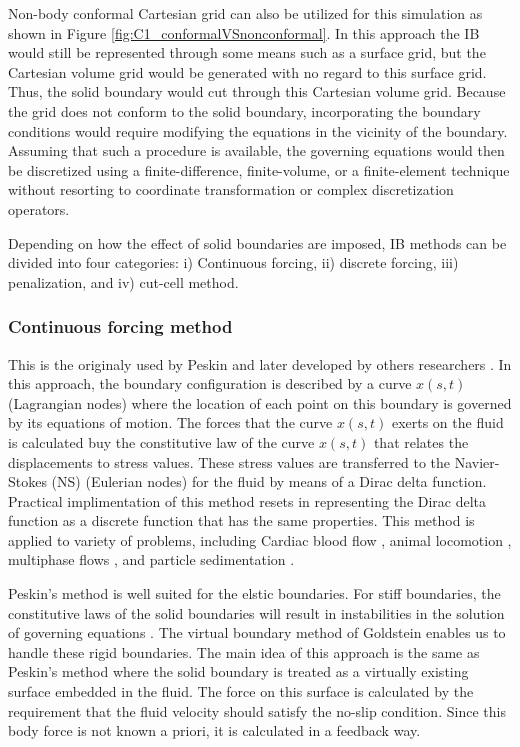 Non-body conformal Cartesian grid can also be utilized for this simulation as shown in Figure \ref{fig:C1_conformalVSnonconformal}. In this approach the IB would still be represented through some means such as a surface grid, but the Cartesian volume grid would be generated with no regard to this surface grid. Thus, the solid boundary would cut through this Cartesian volume grid. Because the grid does not conform to the solid boundary, incorporating the boundary conditions would require modifying the equations in the vicinity of the boundary. Assuming that such a procedure is available, the governing equations would then be discretized using a finite-difference, finite-volume, or a finite-element technique without resorting to coordinate transformation or complex discretization operators.

Depending on how the effect of solid boundaries are imposed, IB methods can be divided into four categories: i) Continuous forcing, ii) discrete forcing, iii) penalization, and iv) cut-cell method.

\subsubsection{Continuous forcing method}
This is the originaly used by Peskin \cite{peskin1977numerical} and later developed by others researchers \cite{saiki1996numerical, zhu2003interaction, beyer1992analysis}. In this approach, the boundary configuration is described by a curve $x(s,t)$ (Lagrangian nodes) where the location of each point on this boundary is governed by its equations of motion. The forces that the curve $x(s,t)$ exerts on the fluid is calculated buy the constitutive law of the curve $x(s,t)$ that relates the displacements to stress values. These stress values are transferred to the Navier-Stokes (NS) (Eulerian nodes) for the fluid by means of a Dirac delta function. Practical implimentation of this method resets in representing the Dirac delta function as a discrete function that has the same properties. This method is applied to variety of problems, including Cardiac blood flow \cite{peskin1989three}, animal locomotion \cite{fauci1988computational}, multiphase flows \cite{kempe2015imposing}, and particle sedimentation \cite{uhlmann2005immersed}.

Peskin's method is well suited for the elstic boundaries. For stiff boundaries, the constitutive laws of the solid boundaries will result in instabilities in the solution of governing equations \cite{mittal2005immersed}. The virtual boundary method of Goldstein \cite{goldstein1993modeling} enables us to handle these rigid boundaries. The main idea of this approach is the same as Peskin's method where the solid boundary is treated as a virtually existing surface embedded in the fluid. The force on this surface is calculated by the requirement that the fluid velocity should satisfy the no-slip condition. Since this body force is not known a priori, it is calculated in a feedback way.

